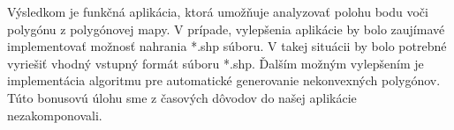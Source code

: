\documentclass[12pt]{article}
\begin{document}
Výsledkom je funkčná aplikácia, ktorá umožňuje analyzovať polohu bodu voči polygónu z polygónovej mapy. V prípade, vylepšenia aplikácie by bolo zaujímavé implementovať možnosť nahrania *.shp súboru. V takej situácii by bolo potrebné vyriešiť vhodný vstupný formát súboru *.shp. Ďalším možným vylepšením je implementácia algoritmu pre automatické generovanie nekonvexných polygónov. Túto bonusovú úlohu sme z časových dôvodov do našej aplikácie nezakomponovali.
\nocite{*}
{}

    
\end{document}
